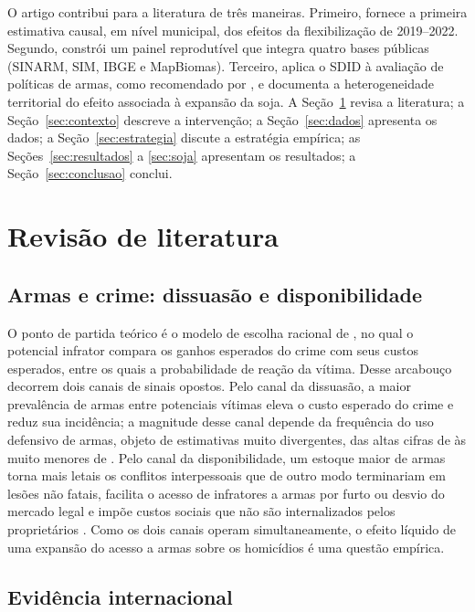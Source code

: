 \documentclass[11pt,a4paper]{article}
\begin{document}
O artigo contribui para a literatura de três maneiras. Primeiro, fornece a primeira estimativa causal, em nível municipal, dos efeitos da flexibilização de 2019--2022. Segundo, constrói um painel reprodutível que integra quatro bases públicas (SINARM, SIM, IBGE e MapBiomas). Terceiro, aplica o SDID à avaliação de políticas de armas, como recomendado por \citet{benmichael2024}, e documenta a heterogeneidade territorial do efeito associada à expansão da soja. A Seção~\ref{sec:literatura} revisa a literatura; a Seção~\ref{sec:contexto} descreve a intervenção; a Seção~\ref{sec:dados} apresenta os dados; a Seção~\ref{sec:estrategia} discute a estratégia empírica; as Seções~\ref{sec:resultados} a \ref{sec:soja} apresentam os resultados; a Seção~\ref{sec:conclusao} conclui.

\section{Revisão de literatura}\label{sec:literatura}

\subsection{Armas e crime: dissuasão e disponibilidade}

O ponto de partida teórico é o modelo de escolha racional de \citet{becker1968}, no qual o potencial infrator compara os ganhos esperados do crime com seus custos esperados, entre os quais a probabilidade de reação da vítima. Desse arcabouço decorrem dois canais de sinais opostos. Pelo canal da dissuasão, a maior prevalência de armas entre potenciais vítimas eleva o custo esperado do crime e reduz sua incidência; a magnitude desse canal depende da frequência do uso defensivo de armas, objeto de estimativas muito divergentes, das altas cifras de \citet{kleck1995} às muito menores de \citet{cook1998}. Pelo canal da disponibilidade, um estoque maior de armas torna mais letais os conflitos interpessoais que de outro modo terminariam em lesões não fatais, facilita o acesso de infratores a armas por furto ou desvio do mercado legal e impõe custos sociais que não são internalizados pelos proprietários \citep{cook2006}. Como os dois canais operam simultaneamente, o efeito líquido de uma expansão do acesso a armas sobre os homicídios é uma questão empírica.

\subsection{Evidência internacional}
\end{document}
